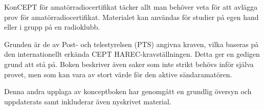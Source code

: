\newpage
\AddToShipoutPicture*{\BackgroundPicLast}

\color{white}

KonCEPT för amatörradiocertifikat täcker allt man behöver veta för att
avlägga prov för amatörradiocertifikat. Materialet kan användas för studier
på egen hand eller i grupp på en radioklubb.

Grunden är de av Post- och telestyrelsen (PTS) angivna kraven, vilka baseras på
den internationellt erkända CEPT HAREC-kravställningen. Detta ger en gedigen
grund att stå på. Boken beskriver även saker som inte strikt behövs inför
själva provet, men som kan vara av stort värde för den aktive sändaramatören.

Denna andra upplaga av konceptboken har genomgått en grundlig översyn och uppdaterats samt inkluderar även nyskrivet material.
